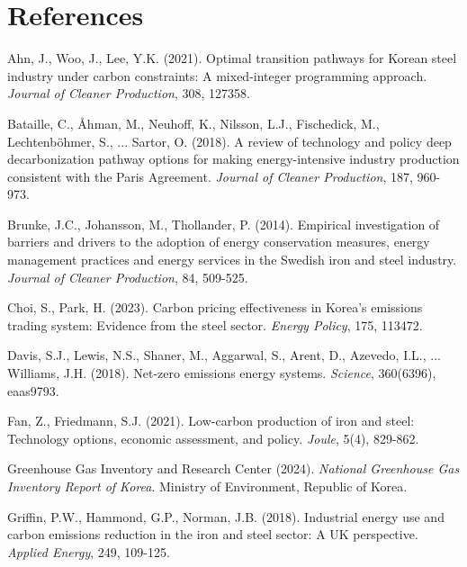\documentclass[preprint,5p,authoryear]{elsarticle}
\begin{document}
\section*{References}
\begin{thebibliography}{99}

 Ahn, J., Woo, J., Lee, Y.K. (2021). Optimal transition pathways for Korean steel industry under carbon constraints: A mixed-integer programming approach. \textit{Journal of Cleaner Production}, 308, 127358.

 Bataille, C., Åhman, M., Neuhoff, K., Nilsson, L.J., Fischedick, M., Lechtenböhmer, S., ... Sartor, O. (2018). A review of technology and policy deep decarbonization pathway options for making energy-intensive industry production consistent with the Paris Agreement. \textit{Journal of Cleaner Production}, 187, 960-973.

 Brunke, J.C., Johansson, M., Thollander, P. (2014). Empirical investigation of barriers and drivers to the adoption of energy conservation measures, energy management practices and energy services in the Swedish iron and steel industry. \textit{Journal of Cleaner Production}, 84, 509-525.

 Choi, S., Park, H. (2023). Carbon pricing effectiveness in Korea's emissions trading system: Evidence from the steel sector. \textit{Energy Policy}, 175, 113472.

 Davis, S.J., Lewis, N.S., Shaner, M., Aggarwal, S., Arent, D., Azevedo, I.L., ... Williams, J.H. (2018). Net-zero emissions energy systems. \textit{Science}, 360(6396), eaas9793.

 Fan, Z., Friedmann, S.J. (2021). Low-carbon production of iron and steel: Technology options, economic assessment, and policy. \textit{Joule}, 5(4), 829-862.

 Greenhouse Gas Inventory and Research Center (2024). \textit{National Greenhouse Gas Inventory Report of Korea}. Ministry of Environment, Republic of Korea.

 Griffin, P.W., Hammond, G.P., Norman, J.B. (2018). Industrial energy use and carbon emissions reduction in the iron and steel sector: A UK perspective. \textit{Applied Energy}, 249, 109-125.


\end{thebibliography}
\end{document}
